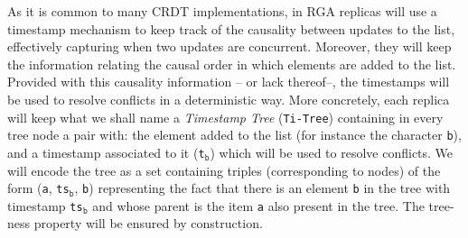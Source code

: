 As it is common to many CRDT implementations, in RGA replicas will use
a timestamp mechanism to keep track of the causality between updates
to the list, effectively capturing when two updates are concurrent.
Moreover, they will keep the information relating the causal order
in which elements are added to the list.
%
Provided with this causality information -- or lack thereof--, the
timestamps will be used to resolve conflicts in a deterministic way.
%
More concretely, each replica will keep what we shall name a
\emph{Timestamp Tree} (\lstinline|Ti-Tree|) containing in every tree
node a pair with: the element added to the list (for instance the
character \lstinline|b|), and a timestamp associated to it
(\lstinline|t|$_{\mathtt{b}}$) which will be used to resolve
conflicts.
%
We will encode the tree as a set containing triples (corresponding to
nodes) of the form (\lstinline|a|, \lstinline|ts|$_{\mathtt{b}}$, \lstinline|b|)
representing the fact that there is an element \lstinline|b| in the
tree with timestamp \lstinline|ts|$_{\mathtt{b}}$ and whose parent is the item
\lstinline|a| also present in the tree.
%
The tree-ness property will be ensured by construction.


